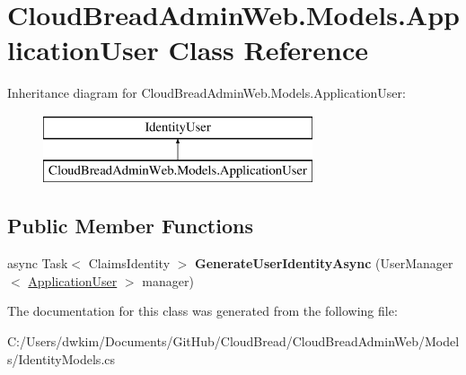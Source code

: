 \hypertarget{class_cloud_bread_admin_web_1_1_models_1_1_application_user}{}\section{Cloud\+Bread\+Admin\+Web.\+Models.\+Application\+User Class Reference}
\label{class_cloud_bread_admin_web_1_1_models_1_1_application_user}
Inheritance diagram for Cloud\+Bread\+Admin\+Web.\+Models.\+Application\+User\+:\begin{figure}[H]
\begin{center}
\leavevmode
\includegraphics[height=2.000000cm]{class_cloud_bread_admin_web_1_1_models_1_1_application_user}
\end{center}
\end{figure}
\subsection*{Public Member Functions}
\begin{DoxyCompactItemize}
\item 
async Task$<$ Claims\+Identity $>$ {\bfseries Generate\+User\+Identity\+Async} (User\+Manager$<$ \hyperlink{class_cloud_bread_admin_web_1_1_models_1_1_application_user}{Application\+User} $>$ manager)\hypertarget{class_cloud_bread_admin_web_1_1_models_1_1_application_user_a18c626164316c53c14d4a2cc3b48bc45}{}\label{class_cloud_bread_admin_web_1_1_models_1_1_application_user_a18c626164316c53c14d4a2cc3b48bc45}

\end{DoxyCompactItemize}


The documentation for this class was generated from the following file\+:\begin{DoxyCompactItemize}
\item 
C\+:/\+Users/dwkim/\+Documents/\+Git\+Hub/\+Cloud\+Bread/\+Cloud\+Bread\+Admin\+Web/\+Models/Identity\+Models.\+cs\end{DoxyCompactItemize}
